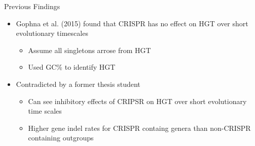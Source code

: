 \documentclass[dvipsnames]{beamer}
\begin{document}
\begin{frame}[fragile]{Previous Findings}
    \begin{itemize}
        \item<2-> Gophna et al. (2015) found that CRISPR has no effect on HGT over short evolutionary timescales\autocite{gophna15}
        \begin{itemize}
            \item<3-> Assume all singletons arrose from HGT
            \item<4-> Used GC\% to identify HGT
        \end{itemize}
        \item<5-> Contradicted by a former thesis student
        \begin{itemize}
            \item<6-> Can see inhibitory effects of CRIPSR on HGT over short evolutionary time scales
            \item<7-> Higher gene indel rates for CRISPR containg genera than non-CRISPR containing outgroups
        \end{itemize}
    \end{itemize}
\end{frame}
\end{document}
